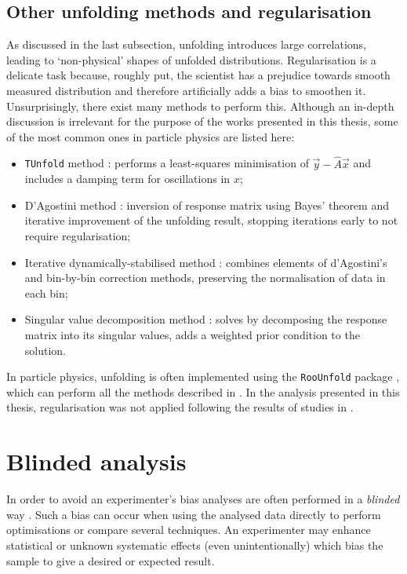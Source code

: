 \subsection{Other unfolding methods and regularisation}
As discussed in the last subsection, unfolding introduces large correlations, leading to `non-physical' shapes of unfolded distributions.
Regularisation is a delicate task because, roughly put, the scientist has a prejudice towards smooth measured distribution and therefore artificially adds a bias to smoothen it.
Unsurprisingly, there exist many methods to perform this.
Although an in-depth discussion is irrelevant for the purpose of the works presented in this thesis, some of the most common ones in particle physics are listed here:
\begin{itemize}
    \item \texttt{TUnfold} method \cite{Schmitt:2012kp}: performs a least-squares minimisation of $\vec{y}-\hat{A}{\vec{x}}$ and includes a damping term for oscillations in $x$;
    \item D'Agostini method \cite{d2010improved,DAgostini:1994fjx}: inversion of response matrix using Bayes' theorem and iterative improvement of the unfolding result, stopping iterations early to not require regularisation;
    \item Iterative dynamically-stabilised method \cite{Malaescu:2009dm}: combines elements of d'Agostini's and bin-by-bin correction methods, preserving the normalisation of data in each bin;
    \item Singular value decomposition method \cite{Hocker:1995kb}: solves  by decomposing the response matrix into its singular values, adds a weighted prior condition to the solution.
\end{itemize}
In particle physics, unfolding is often implemented using the \texttt{RooUnfold} package \cite{Brenner:2019lmf}, which can perform all the methods described in .
In the analysis presented in this thesis, regularisation was not applied following the results of studies in .

\section{Blinded analysis}\label{sec:blinding}

In order to avoid an experimenter's bias analyses are often performed in a \textit{blinded} way \cite{Roodman:2003rw}.
Such a bias can occur when using the analysed data directly to perform optimisations or compare several techniques.
An experimenter may enhance statistical or unknown systematic effects (even unintentionally) which bias the sample to give a desired or expected result.

